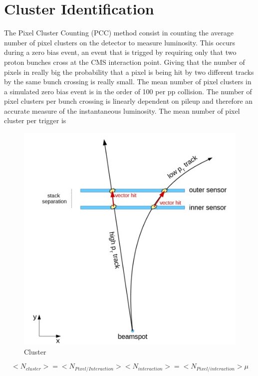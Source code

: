 \section{Cluster Identification}

The Pixel Cluster Counting (PCC) method consist in counting the average number of pixel clusters on the detector to measure luminosity. This occurs during a zero bias event, an event that is trigged by requiring only that two proton bunches cross at the CMS interaction point. Giving that the number of pixels in really big the probability that a pixel is being hit by two different tracks by the same bunch crossing is really small. The mean number of pixel clusters in a simulated zero bias event is in the order of 100 per pp collision. The number of pixel clusters per bunch crossing is linearly dependent on pileup and therefore an accurate measure of the instantaneous luminosity.\cite{PCC1} The mean number of pixel cluster per trigger is 

\begin{figure}[h]
    \centering
    \includegraphics[width=1\textwidth]{cluster2.jpg}
    \caption{Cluster}
    \label{fig:cluster}
\end{figure}


\begin{equation}
<N_{cluster}> = <N_{Pixel/Interaction}> <N_{interaction}> = <N_{Pixel/interaction}> \mu 
\end{equation}

